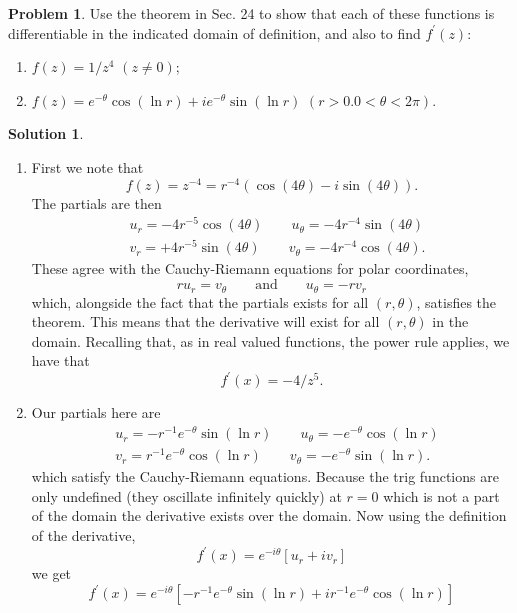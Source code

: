 \documentclass[10pt]{article}
\theoremstyle{definition}
\newtheorem{problem}{Problem}
\newtheorem{soln}{Solution}
\newcommand{\primed}[1]{#1^\prime}
\begin{document}
\begin{problem}
Use the theorem in Sec. 24 to show that each of these functions is differentiable in the
indicated domain of definition, and also to find $\primed{f}(z)$:
\begin{enumerate}[label=(\alph*)]
  \item $f(z)=1/z^4$ $(z\neq 0)$;
  \item $f(z)=e^{-\theta}\cos\left(\ln r\right)+ie^{-\theta}\sin\left(\ln r\right)$ $(r>0. 0<\theta<2\pi)$.
\end{enumerate}
\end{problem}
\begin{soln}~
  \begin{enumerate}[label=(\alph*)]
    \item First we note that
          $$f(z)=z^{-4}=r^{-4}\left(\cos\left(4\theta\right)-i\sin\left(4\theta\right)\right).$$
          The partials are then
          \begin{align*}
             & u_r=-4r^{-5}\cos\left(4\theta\right)\qquad u_\theta=-4r^{-4}\sin\left(4\theta\right)  \\
             & v_r=+4r^{-5}\sin\left(4\theta\right)\qquad v_\theta=-4r^{-4}\cos\left(4\theta\right).
          \end{align*}
          These agree with the Cauchy-Riemann equations for polar coordinates,
          $$ru_r=v_\theta\qquad\text{and}\qquad u_\theta=-rv_r$$
          which, alongside the fact that the partials exists for all $(r,\theta)$, satisfies
          the theorem. This means that the derivative will exist for all $(r,\theta)$ in the domain.
          Recalling that, as in real valued functions, the power rule applies, we have that
          $$\primed{f}(x)=-4/z^5.$$
    \item Our partials here are
          \begin{align*}
             & u_r=-r^{-1}e^{-\theta}\sin\left(\ln r\right)\qquad u_\theta=-e^{-\theta}\cos\left(\ln r\right) \\
             & v_r=r^{-1}e^{-\theta}\cos\left(\ln r\right)\qquad v_\theta=-e^{-\theta}\sin\left(\ln r\right).
          \end{align*}
          which satisfy the Cauchy-Riemann equations. Because the trig functions are only undefined (they oscillate infinitely quickly) at $r=0$ which is not
          a part of the domain the derivative exists over the domain.
          Now using the definition of the derivative,
          $$\primed{f}(x)=e^{-i\theta}\left[u_r+iv_r\right]$$
          we get
          $$\primed{f}(x)=e^{-i\theta}\left[-r^{-1}e^{-\theta}\sin\left(\ln r\right)+ir^{-1}e^{-\theta}\cos\left(\ln r\right)\right]$$
  \end{enumerate}
\end{soln}
\end{document}
